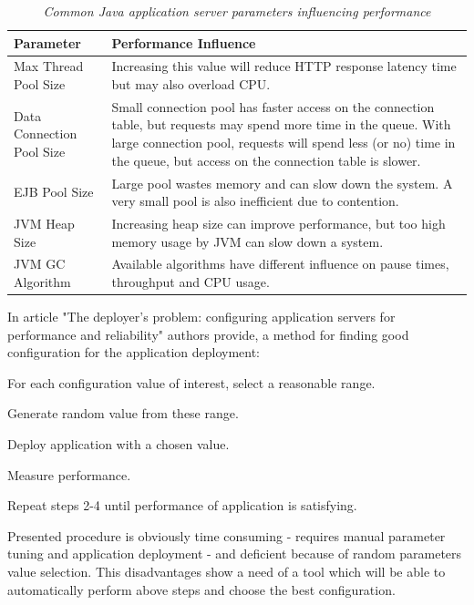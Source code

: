 \documentclass[12pt,a4paper]{article}
\let\tmpone\enumerate
\let\tmptwo\endenumerate
\renewenvironment{enumerate}{\tmpone\addtolength{\itemsep}{-0.4\baselineskip}}{\tmptwo}
\begin{document}
\begin{table}[!htb]
\begin{center}
\begin{tabularx}{\textwidth}{p{3cm}|X}
  \textbf{Parameter} & \textbf{Performance Influence} \\
\hline
Max Thread Pool Size & Increasing this value will reduce HTTP response latency time but may also overload CPU.\\
 
Data Connection Pool Size & Small connection pool has faster access on the connection table, but requests may spend more time in the queue. With large connection pool, requests will spend less (or no) time in the 
queue, but access on the connection table is slower.\\

EJB Pool Size & Large pool wastes memory and  can slow down the system. A very small pool is also inefficient due to contention. \\

JVM Heap Size & Increasing heap size can improve performance, but too high memory usage by JVM can slow down a system.   \\

JVM GC Algorithm & Available algorithms have different influence on pause 
times, throughput and CPU usage.
\end{tabularx}
\end{center}
\caption{\textit{Common Java application server parameters influencing performance}}
\label{glassfishparams}
\end{table}

In article "The deployer's problem: configuring application servers for performance and reliability" \cite{deployerproblem} authors provide, a method for finding good configuration for the application deployment:

\begin{enumerate}
\item For each configuration value of interest, select a reasonable range. 
\item Generate random value from these range.
\item Deploy application with a chosen value.
\item Measure performance.
\item Repeat steps 2-4 until performance of application is satisfying. 
\end{enumerate}

Presented procedure is obviously time consuming - requires manual parameter tuning and application deployment - and deficient because of random parameters value selection. This disadvantages show a need of a tool which will be able to automatically perform above steps and choose the best configuration.
\end{document}
